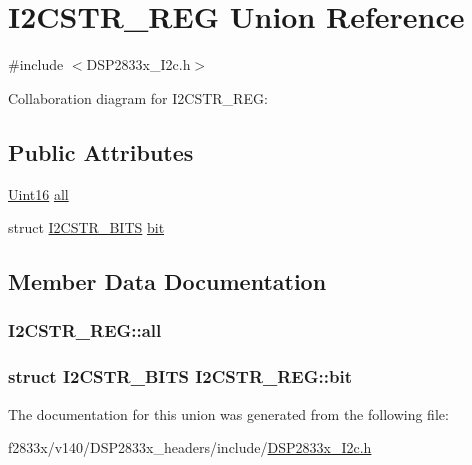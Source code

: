 \hypertarget{union_i2_c_s_t_r___r_e_g}{}\section{I2\+C\+S\+T\+R\+\_\+\+R\+E\+G Union Reference}
\label{union_i2_c_s_t_r___r_e_g}


{\ttfamily \#include $<$D\+S\+P2833x\+\_\+\+I2c.\+h$>$}



Collaboration diagram for I2\+C\+S\+T\+R\+\_\+\+R\+E\+G\+:
\subsection*{Public Attributes}
\begin{DoxyCompactItemize}
\item 
\hyperlink{_d_s_p2833x___device_8h_a59a9f6be4562c327cbfb4f7e8e18f08b}{Uint16} \hyperlink{union_i2_c_s_t_r___r_e_g_accdc636f5f8a855d9b6beb3308c39127}{all}
\item 
struct \hyperlink{struct_i2_c_s_t_r___b_i_t_s}{I2\+C\+S\+T\+R\+\_\+\+B\+I\+T\+S} \hyperlink{union_i2_c_s_t_r___r_e_g_aa939f092edf01a27e251fa8db3dc27ce}{bit}
\end{DoxyCompactItemize}


\subsection{Member Data Documentation}
\hypertarget{union_i2_c_s_t_r___r_e_g_accdc636f5f8a855d9b6beb3308c39127}{}
\subsubsection[{all}]{ I2\+C\+S\+T\+R\+\_\+\+R\+E\+G\+::all}\label{union_i2_c_s_t_r___r_e_g_accdc636f5f8a855d9b6beb3308c39127}
\hypertarget{union_i2_c_s_t_r___r_e_g_aa939f092edf01a27e251fa8db3dc27ce}{}
\subsubsection[{bit}]{\setlength{\rightskip}{0pt plus 5cm}struct {\bf I2\+C\+S\+T\+R\+\_\+\+B\+I\+T\+S} I2\+C\+S\+T\+R\+\_\+\+R\+E\+G\+::bit}\label{union_i2_c_s_t_r___r_e_g_aa939f092edf01a27e251fa8db3dc27ce}


The documentation for this union was generated from the following file\+:\begin{DoxyCompactItemize}
\item 
f2833x/v140/\+D\+S\+P2833x\+\_\+headers/include/\hyperlink{_d_s_p2833x___i2c_8h}{D\+S\+P2833x\+\_\+\+I2c.\+h}\end{DoxyCompactItemize}
